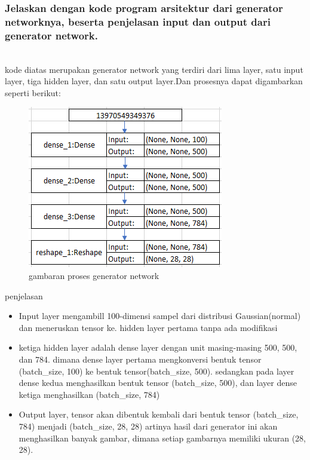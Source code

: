 \subsubsection{Jelaskan dengan kode program arsitektur dari generator networknya, beserta penjelasan input dan output dari generator network.}
\hfill\\

kode diatas merupakan generator network yang terdiri dari lima layer, satu input layer, tiga hidden layer, dan satu output layer.Dan prosesnya dapat digambarkan seperti berikut:
\begin{figure}[H]
	\centering
	\includegraphics[scale=0.5]{figures/1174087/8/3a.png}
	\caption{gambaran proses generator network}
\end{figure}
penjelasan
\begin{itemize}
	\item Input layer mengambill 100-dimensi sampel dari distribusi Gaussian(normal) dan meneruskan tensor ke. hidden layer pertama tanpa ada modifikasi
	\item ketiga hidden layer adalah dense layer dengan unit masing-masing 500, 500, dan 784. dimana dense layer pertama mengkonversi bentuk tensor (batch\_size, 100) ke bentuk tensor(batch\_size, 500). sedangkan pada layer dense kedua menghasilkan bentuk tensor (batch\_size, 500), dan layer dense ketiga menghasilkan (batch\_size, 784)
	\item Output layer, tensor akan dibentuk kembali dari bentuk tensor (batch\_size, 784) menjadi (batch\_size, 28, 28) artinya hasil dari generator ini akan menghasilkan banyak gambar, dimana setiap gambarnya memiliki ukuran (28, 28). 
\end{itemize}

